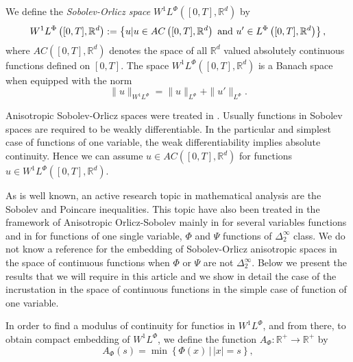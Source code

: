 \documentclass[twoside]{article}
\theoremstyle{remark}
\newcommand{\orlnor}{\|_{L^{\Phi}}}
\newcommand{\lphi}{L^{\Phi}}
\newcommand{\ephi}{E^{\Phi}}
\newcommand{\wphi}{W^{1}\lphi}
\newcommand{\wphie}{W^{1}\ephi}
\newcommand{\rr}{\mathbb{R}}
\begin{document}
We define the \emph{Sobolev-Orlicz space} $\wphi\left([0,T],\rr^d\right)$ by
\[\wphi\left([0,T],\rr^d\right):=\left\{u| u\in AC\left([0,T],\rr^d\right) \hbox{ and } u'\in \lphi\left([0,T],\rr^d\right)\right\},\]
where $AC\left([0,T],\rr^d\right)$ denotes the space of all $\rr^d$ valued absolutely continuous functions defined on $[0,T]$. The space $\wphi\left([0,T],\rr^d\right)$ is a Banach space when equipped with the norm
\begin{equation}\label{def-norma-orlicz-sob}
\|  u  \|_{\wphi}= \|  u  \|_{\lphi} + \|u'\orlnor.
\end{equation}

Anisotropic Sobolev-Orlicz spaces were treated in \cite{cianchi2000fully,cianchi2004optimal,chamra2017anisotropic,trudinger1974imbedding}. Usually functions in Sobolev spaces are required to be weakly differentiable. In the particular and simplest case of functions of one variable, the weak differentiability implies absolute continuity. Hence we can assume $u\in AC\left([0,T],\rr^d\right)$ for functions $u\in\wphi\left([0,T],\rr^d\right)$.
% 
% 


As is well known, an active research topic in mathematical analysis are the Sobolev and Poincare inequalities. This topic have also been treated in the framework of Anisotropic Orlicz-Sobolev mainly in \cite{cianchi2000fully,cianchi2004optimal,trudinger1974imbedding} for several variables functions and in \cite{chamra2017anisotropic} for functions of one single variable, $\Phi$ and $\Psi$ functions of $\Delta_2^{\infty}$ class.   We do not know a reference for the embedding of Sobolev-Orlicz anisotropic spaces in the space of continuous functions when $\Phi$ or $\Psi$ are not $\Delta_2^{\infty}$. Below we present the results that we will require in this article and we show in detail the case of the incrustation in the space of continuous functions in the simple case of function of one variable.

In order to find a modulus of continuity for functios in $\wphi$, and from there, to obtain compact embedding of $\wphi$, we define the function $A_{\Phi}:\rr^+\to\rr^+$ by
\begin{equation}\label{eq:inversa-gral}
A_{\Phi}(s)=\min\left\{\Phi(x)\,\big|\,|x|=s\right\},
\end{equation}
\end{document}
